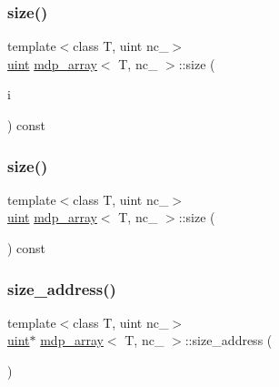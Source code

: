 \mbox{\label{classmdp__array_aa4d57a7f99a8889e70314e0116f59eee}} 
\subsubsection{\texorpdfstring{size()}{size()}\hspace{0.1cm}{\footnotesize\ttfamily [1/2]}}
{\footnotesize\ttfamily template$<$class T, uint nc\+\_\+$>$ \\
\hyperlink{mdp__global__vars_8h_a91ad9478d81a7aaf2593e8d9c3d06a14}{uint} \hyperlink{classmdp__array}{mdp\+\_\+array}$<$ T, nc\+\_\+ $>$\+::size (\begin{DoxyParamCaption}\item[{\hyperlink{mdp__global__vars_8h_a91ad9478d81a7aaf2593e8d9c3d06a14}{uint}}]{i }\end{DoxyParamCaption}) const\hspace{0.3cm}{\ttfamily [inline]}}

\mbox{\label{classmdp__array_a4b68d139d11d40eb148a778c43779e4f}} 
\subsubsection{\texorpdfstring{size()}{size()}\hspace{0.1cm}{\footnotesize\ttfamily [2/2]}}
{\footnotesize\ttfamily template$<$class T, uint nc\+\_\+$>$ \\
\hyperlink{mdp__global__vars_8h_a91ad9478d81a7aaf2593e8d9c3d06a14}{uint} \hyperlink{classmdp__array}{mdp\+\_\+array}$<$ T, nc\+\_\+ $>$\+::size (\begin{DoxyParamCaption}{ }\end{DoxyParamCaption}) const\hspace{0.3cm}{\ttfamily [inline]}}

\mbox{\label{classmdp__array_aee0c0b97d3f8bb9d3f8ecedb77d14e6d}} 
\subsubsection{\texorpdfstring{size\+\_\+address()}{size\_address()}}
{\footnotesize\ttfamily template$<$class T, uint nc\+\_\+$>$ \\
\hyperlink{mdp__global__vars_8h_a91ad9478d81a7aaf2593e8d9c3d06a14}{uint}$\ast$ \hyperlink{classmdp__array}{mdp\+\_\+array}$<$ T, nc\+\_\+ $>$\+::size\+\_\+address (\begin{DoxyParamCaption}{ }\end{DoxyParamCaption})\hspace{0.3cm}{\ttfamily [inline]}}



